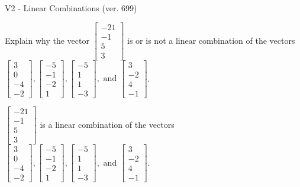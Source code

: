 \begin{exercise}
  \begin{exerciseTitle}V2 - Linear Combinations (ver. 699)\end{exerciseTitle}
  \begin{exerciseStatement}
    Explain why the vector \(\left[\begin{array}{c}
-21 \\
-1 \\
5 \\
3
\end{array}\right]\)  is or is not a linear 
	combination of the vectors \(\left[\begin{array}{c}
3 \\
0 \\
-4 \\
-2
\end{array}\right] , \left[\begin{array}{c}
-5 \\
-1 \\
-2 \\
1
\end{array}\right] , \left[\begin{array}{c}
-5 \\
1 \\
1 \\
-3
\end{array}\right] , \text{ and } \left[\begin{array}{c}
3 \\
-2 \\
4 \\
-1
\end{array}\right]\).
	


  \end{exerciseStatement}
  \begin{exerciseAnswer}
   \(\left[\begin{array}{c}
-21 \\
-1 \\
5 \\
3
\end{array}\right]\) 
  	 is  
	a linear combination of the vectors \(\left[\begin{array}{c}
3 \\
0 \\
-4 \\
-2
\end{array}\right] , \left[\begin{array}{c}
-5 \\
-1 \\
-2 \\
1
\end{array}\right] , \left[\begin{array}{c}
-5 \\
1 \\
1 \\
-3
\end{array}\right] , \text{ and } \left[\begin{array}{c}
3 \\
-2 \\
4 \\
-1
\end{array}\right]\).


\end{exerciseAnswer}
\end{exercise}
